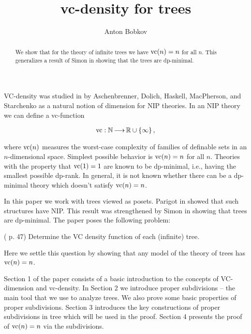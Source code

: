\documentclass{amsart}
\newcommand{\curly}[1]{\left\{#1\right\}}
\begin{document}
\title{vc-density for trees}
\author{Anton Bobkov}

\begin{abstract}
  We show that for the theory of infinite trees we have $\operatorname{vc}(n) = n$ for all $n$.
  This generalizes a result of Simon in \cite{simon_dp_min} showing that the trees are dp-minimal. 
\end{abstract}

\maketitle

VC-density was studied in \cite{density} by Aschenbrenner, Dolich, Haskell, MacPherson, and Starchenko as a natural notion of dimension for NIP theories. In an NIP theory we can define a vc-function

\begin{align*}
  \vc : \N \arr \R \cup \curly{\infty},
\end{align*}

where $\operatorname{vc}(n)$ measures the worst-case complexity of families of definable sets in an $n$-dimensional space. Simplest possible behavior is $\operatorname{vc}(n) = n$ for all $n$. Theories with the property that $\operatorname{vc}(1) = 1$ are known to be dp-minimal, i.e., having the smallest possible dp-rank. In general, it is not known whether there can be a dp-minimal theory which doesn't satisfy $\operatorname{vc}(n)=n$.

In this paper we work with trees viewed as posets.
Parigot in \cite{parigot_trees} showed that such structures have NIP.
This result was strengthened by Simon in \cite{simon_dp_min} showing that trees are dp-minimal.
The paper \cite{density} poses the following problem:

\begin{Problem} (\cite{density} p. 47)
  Determine the VC density function of each (infinite) tree.
\end{Problem}

Here we settle this question by showing that any model of the theory of trees has $\operatorname{vc}(n) = n$.

Section 1 of the paper consists of a basic introduction to the concepts of VC-dimension and vc-density.
In Section 2 we introduce proper subdivisions -- the main tool that we use to analyze trees.
We also prove some basic properties of proper subdivisions.
Section 3 introduces the key constructions of proper subdivisions in tree which will be used in the proof.
Section 4 presents the proof of $\operatorname{vc}(n) = n$ via the subdivisions.
\end{document}
